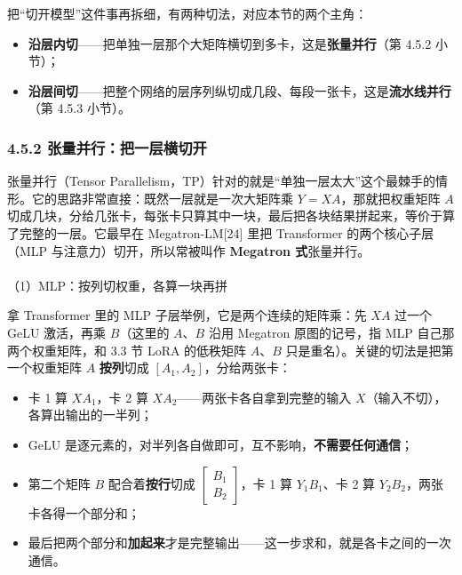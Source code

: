 \documentclass[
  chinese,
]{ctexart}
\makeatletter
\let\oldparagraph\paragraph
\renewcommand{\paragraph}{
    \@ifstar
      \xxxParagraphStar
      \xxxParagraphNoStar
  }
\newcommand{\xxxParagraphStar}[1]{\oldparagraph*{#1}\mbox{}}
\newcommand{\xxxParagraphNoStar}[1]{\oldparagraph{#1}\mbox{}}
\providecommand{\tightlist}{%
  \setlength{\itemsep}{0pt}\setlength{\parskip}{0pt}}
\makeatother
\begin{document}
把``切开模型''这件事再拆细，有两种切法，对应本节的两个主角：

\begin{itemize}
\tightlist
\item
  \textbf{沿层内切}------把单独一层那个大矩阵横切到多卡，这是\textbf{张量并行}（第
  4.5.2 小节）；
\item
  \textbf{沿层间切}------把整个网络的层序列纵切成几段、每段一张卡，这是\textbf{流水线并行}（第
  4.5.3 小节）。
\end{itemize}

\subsubsection{4.5.2
张量并行：把一层横切开}\label{ux5f20ux91cfux5e76ux884cux628aux4e00ux5c42ux6a2aux5207ux5f00}

张量并行（Tensor
Parallelism，TP）针对的就是``单独一层太大''这个最棘手的情形。它的思路非常直接：既然一层就是一次大矩阵乘
\(Y = XA\)，那就把权重矩阵 \(A\)
切成几块，分给几张卡，每张卡只算其中一块，最后把各块结果拼起来，等价于算了完整的一层。它最早在
Megatron-LM{[}24{]} 里把 Transformer 的两个核心子层（MLP
与注意力）切开，所以常被叫作 \textbf{Megatron 式}张量并行。

\paragraph{（1）MLP：按列切权重，各算一块再拼}\label{mlpux6309ux5217ux5207ux6743ux91cdux5404ux7b97ux4e00ux5757ux518dux62fc}

拿 Transformer 里的 MLP 子层举例，它是两个连续的矩阵乘：先 \(XA\) 过一个
GeLU 激活，再乘 \(B\)（这里的 \(A\)、\(B\) 沿用 Megatron 原图的记号，指
MLP 自己那两个权重矩阵，和 3.3 节 LoRA 的低秩矩阵 \(A\)、\(B\)
只是重名）。关键的切法是把第一个权重矩阵 \(A\) \textbf{按列}切成
\([A_1, A_2]\)，分给两张卡：

\begin{itemize}
\tightlist
\item
  卡 1 算 \(XA_1\)，卡 2 算 \(XA_2\)------两张卡各自拿到完整的输入
  \(X\)（输入不切），各算出输出的一半列；
\item
  GeLU 是逐元素的，对半列各自做即可，互不影响，\textbf{不需要任何通信}；
\item
  第二个矩阵 \(B\) 配合着\textbf{按行}切成
  \(\begin{bmatrix} B_1 \\ B_2 \end{bmatrix}\)，卡 1 算 \(Y_1 B_1\)、卡
  2 算 \(Y_2 B_2\)，两张卡各得一个部分和；
\item
  最后把两个部分和\textbf{加起来}才是完整输出------这一步求和，就是各卡之间的一次通信。
\end{itemize}
\end{document}
